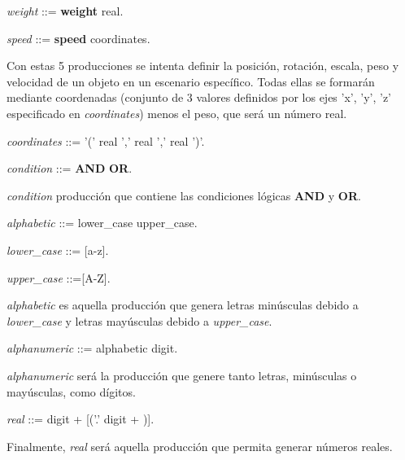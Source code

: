 \documentclass[12pt]{article}
\begin{document}
\noindent \textit{weight} ::= \textbf{weight} real.

\noindent \textit{speed} ::= \textbf{speed} coordinates.

Con estas 5 producciones se intenta definir la posición, rotación, escala, peso y velocidad de un objeto en un escenario específico. Todas ellas se formarán mediante coordenadas (conjunto de 3 valores definidos por los ejes 'x', 'y', 'z' especificado en \textit{coordinates}) menos el peso, que será un número real.

\noindent \textit{coordinates} ::= '(' real ',' real ','  real ')'.

\noindent \textit{condition} ::= \textbf{AND} \textbar \textbf{OR}.

\textit{condition} producción que contiene las condiciones lógicas \textbf{AND} y \textbf{OR}.

\noindent \textit{alphabetic} ::= lower\_case  \textbar  upper\_case.

\noindent \textit{lower\_case} ::= [a-z].

\noindent \textit{upper\_case} ::=[A-Z].

\textit{alphabetic} es aquella producción que genera letras minúsculas debido a \textit{lower\_case} y letras mayúsculas debido a \textit{upper\_case}.

\noindent \textit{alphanumeric} ::= alphabetic \textbar digit.

\textit{alphanumeric} será la producción que genere tanto letras, minúsculas o mayúsculas, como dígitos.

\noindent \textit{real} ::= digit + [('.' digit + )].

Finalmente, \textit{real} será aquella producción que permita generar números reales.
\end{document}
